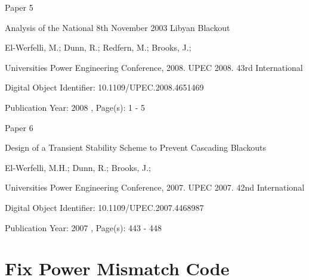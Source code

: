 \documentclass[a4paper,oneside,12pt]{report}
\newcommand{\backmatter}{\cleardoublepage}
\begin{document}



\begin{center}\begin{large}
{\Huge Paper 5}
\vspace{40px}

Analysis of the National 8th November 2003 Libyan Blackout
\vspace{40px}

El-Werfelli, M.; Dunn, R.; Redfern, M.; Brooks, J.;
\vspace{40px}

Universities Power Engineering Conference, 2008. UPEC 2008. 43rd International
\vspace{40px}

Digital Object Identifier: 10.1109/UPEC.2008.4651469

Publication Year: 2008 , Page(s): 1 - 5
\end{large}\end{center}




\begin{center}\begin{large}
{\Huge Paper 6}
\vspace{40px}

Design of a Transient Stability Scheme to Prevent Cascading Blackouts
\vspace{40px}

El-Werfelli, M.H.; Dunn, R.; Brooks, J.;
\vspace{40px}

Universities Power Engineering Conference, 2007. UPEC 2007. 42nd International
\vspace{40px}

Digital Object Identifier: 10.1109/UPEC.2007.4468987

Publication Year: 2007 , Page(s): 443 - 448
\end{large}\end{center}




\chapter{Fix Power Mismatch Code}\label{lbl_sec_code}




\backmatter
{}


\end{document}
